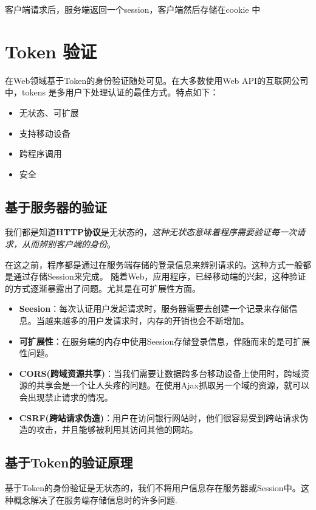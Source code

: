 \documentclass[UTF8,a4paper,12pt]{ctexbook}
\begin{document}
		客户端请求后，服务端返回一个session，客户端然后存储在cookie 中
	
	\section{Token 验证}
		在Web领域基于Token的身份验证随处可见。在大多数使用Web API的互联网公司中，tokens 是多用户下处理认证的最佳方式。特点如下：
			\begin{itemize}[itemindent = 1em]
				\item 无状态、可扩展
				\item 支持移动设备
				\item 跨程序调用
				\item 安全
			\end{itemize}
		
		\subsection{基于服务器的验证}
			我们都是知道\textbf{HTTP协议}是无状态的，\textit{这种无状态意味着程序需要验证每一次请求，从而辨别客户端的身份}。
			
			在这之前，程序都是通过在服务端存储的登录信息来辨别请求的。这种方式一般都是通过存储Session来完成。
			随着Web，应用程序，已经移动端的兴起，这种验证的方式逐渐暴露出了问题。尤其是在可扩展性方面。
			
			\begin{itemize}[itemindent  =1em]
				\item \textbf{Seesion}：每次认证用户发起请求时，服务器需要去创建一个记录来存储信息。当越来越多的用户发请求时，内存的开销也会不断增加。
				\item \textbf{可扩展性}：在服务端的内存中使用Seesion存储登录信息，伴随而来的是可扩展性问题。
				\item \textbf{CORS(跨域资源共享)}：当我们需要让数据跨多台移动设备上使用时，跨域资源的共享会是一个让人头疼的问题。在使用Ajax抓取另一个域的资源，就可以会出现禁止请求的情况。
				\item \textbf{CSRF(跨站请求伪造)}：用户在访问银行网站时，他们很容易受到跨站请求伪造的攻击，并且能够被利用其访问其他的网站。
			\end{itemize}
		
		\subsection{基于Token的验证原理}
			基于Token的身份验证是无状态的，我们不将用户信息存在服务器或Session中。这种概念解决了在服务端存储信息时的许多问题.
			
\end{document}
